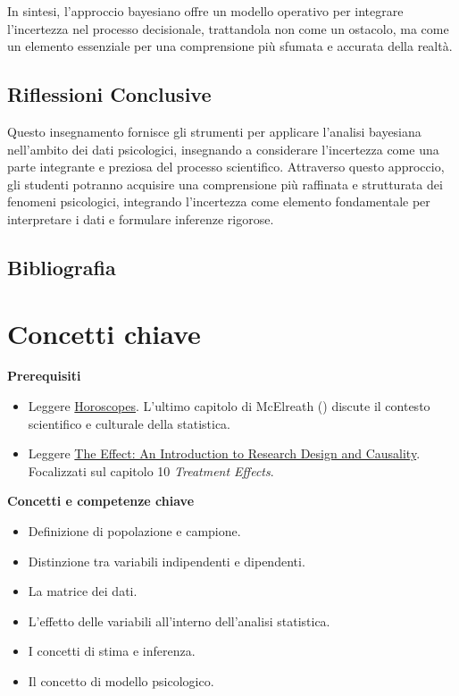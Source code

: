 \documentclass[
  letterpaper,
  DIV=11,
  numbers=noendperiod]{scrreprt}
\providecommand{\tightlist}{%
  \setlength{\itemsep}{0pt}\setlength{\parskip}{0pt}}\usepackage{longtable,booktabs,array}
\theoremstyle{definition}
\theoremstyle{remark}
\begin{document}
In sintesi, l'approccio bayesiano offre un modello operativo per
integrare l'incertezza nel processo decisionale, trattandola non come un
ostacolo, ma come un elemento essenziale per una comprensione più
sfumata e accurata della realtà.

\section{Riflessioni Conclusive}\label{riflessioni-conclusive}

Questo insegnamento fornisce gli strumenti per applicare l'analisi
bayesiana nell'ambito dei dati psicologici, insegnando a considerare
l'incertezza come una parte integrante e preziosa del processo
scientifico. Attraverso questo approccio, gli studenti potranno
acquisire una comprensione più raffinata e strutturata dei fenomeni
psicologici, integrando l'incertezza come elemento fondamentale per
interpretare i dati e formulare inferenze rigorose.

\section*{Bibliografia}\label{bibliografia}


\chapter{Concetti chiave}\label{sec-key-notions}

\textbf{Prerequisiti}

\begin{itemize}
\tightlist
\item
  Leggere \href{../../figures/horoscopes.pdf}{Horoscopes}. L'ultimo
  capitolo di McElreath ()
  discute il contesto scientifico e culturale della statistica.
\item
  Leggere \href{https://theeffectbook.net}{The Effect: An Introduction
  to Research Design and Causality}. Focalizzati sul capitolo 10
  \emph{Treatment Effects}.
\end{itemize}

\textbf{Concetti e competenze chiave}

\begin{itemize}
\tightlist
\item
  Definizione di popolazione e campione.
\item
  Distinzione tra variabili indipendenti e dipendenti.
\item
  La matrice dei dati.
\item
  L'effetto delle variabili all'interno dell'analisi statistica.
\item
  I concetti di stima e inferenza.
\item
  Il concetto di modello psicologico.
\end{itemize}
\end{document}
